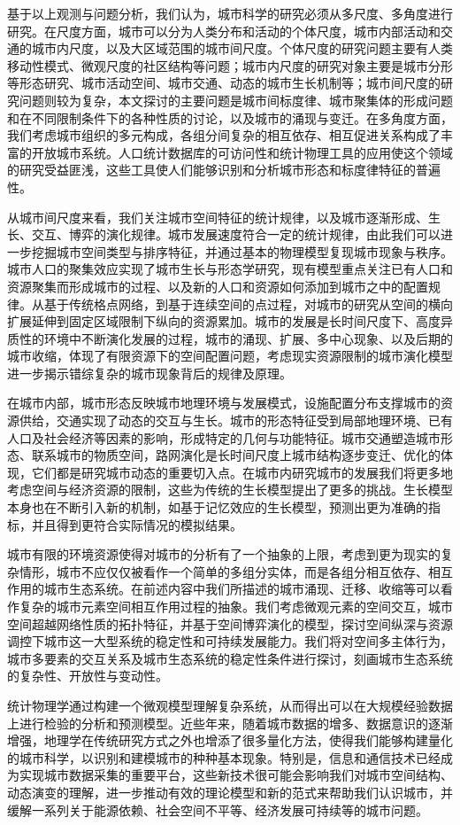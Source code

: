 基于以上观测与问题分析，我们认为，城市科学的研究必须从多尺度、多角度进行研究。在尺度方面，城市可以分为人类分布和活动的个体尺度，城市内部活动和交通的城市内尺度，以及大区域范围的城市间尺度。个体尺度的研究问题主要有人类移动性模式、微观尺度的社区结构等问题；城市内尺度的研究对象主要是城市分形等形态研究、城市活动空间、城市交通、动态的城市生长机制等；城市间尺度的研究问题则较为复杂，本文探讨的主要问题是城市间标度律、城市聚集体的形成问题和在不同限制条件下的各种性质的讨论，以及城市的涌现与变迁。在多角度方面，我们考虑城市组织的多元构成，各组分间复杂的相互依存、相互促进关系构成了丰富的开放城市系统。人口统计数据库的可访问性和统计物理工具的应用使这个领域的研究受益匪浅，这些工具使人们能够识别和分析城市形态和标度律特征的普遍性。

从城市间尺度来看，我们关注城市空间特征的统计规律，以及城市逐渐形成、生长、交互、博弈的演化规律。城市发展速度符合一定的统计规律，由此我们可以进一步挖掘城市空间类型与排序特征，并通过基本的物理模型复现城市现象与秩序。城市人口的聚集效应实现了城市生长与形态学研究，现有模型重点关注已有人口和资源聚集而形成城市的过程、以及新的人口和资源如何添加到城市之中的配置规律。从基于传统格点网络，到基于连续空间的点过程，对城市的研究从空间的横向扩展延伸到固定区域限制下纵向的资源累加。城市的发展是长时间尺度下、高度异质性的环境中不断演化发展的过程，城市的涌现、扩展、多中心现象、以及后期的城市收缩，体现了有限资源下的空间配置问题，考虑现实资源限制的城市演化模型进一步揭示错综复杂的城市现象背后的规律及原理。

在城市内部，城市形态反映城市地理环境与发展模式，设施配置分布支撑城市的资源供给，交通实现了动态的交互与生长。城市的形态特征受到局部地理环境、已有人口及社会经济等因素的影响，形成特定的几何与功能特征。城市交通塑造城市形态、联系城市的物质空间，路网演化是长时间尺度上城市结构逐步变迁、优化的体现，它们都是研究城市动态的重要切入点。在城市内研究城市的发展我们将更多地考虑空间与经济资源的限制，这些为传统的生长模型提出了更多的挑战。生长模型本身也在不断引入新的机制，如基于记忆效应的生长模型，预测出更为准确的指标，并且得到更符合实际情况的模拟结果。

城市有限的环境资源使得对城市的分析有了一个抽象的上限，考虑到更为现实的复杂情形，城市不应仅仅被看作一个简单的多组分实体，而是各组分相互依存、相互作用的城市生态系统。在前述内容中我们所描述的城市涌现、迁移、收缩等可以看作复杂的城市元素空间相互作用过程的抽象。我们考虑微观元素的空间交互，城市空间超越网络性质的拓扑特征，并基于空间博弈演化的模型，探讨空间纵深与资源调控下城市这一大型系统的稳定性和可持续发展能力。我们将对空间多主体行为，城市多要素的交互关系及城市生态系统的稳定性条件进行探讨，刻画城市生态系统的复杂性、开放性与变动性。

统计物理学通过构建一个微观模型理解复杂系统，从而得出可以在大规模经验数据上进行检验的分析和预测模型。近些年来，随着城市数据的增多、数据意识的逐渐增强，地理学在传统研究方式之外也增添了很多量化方法，使得我们能够构建量化的城市科学，以识别和建模城市的种种基本现象。特别是，信息和通信技术已经成为实现城市数据采集的重要平台，这些新技术很可能会影响我们对城市空间结构、动态演变的理解，进一步推动有效的理论模型和新的范式来帮助我们认识城市，并缓解一系列关于能源依赖、社会空间不平等、经济发展可持续等的城市问题。
